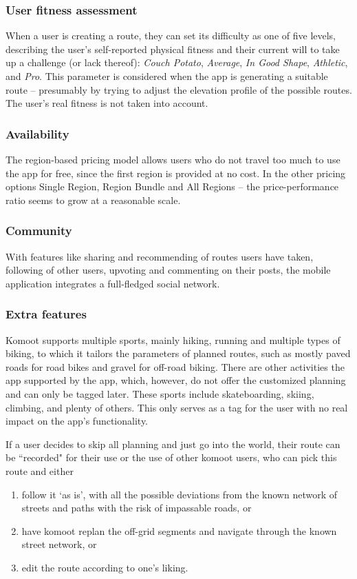 \subsubsection*{User fitness assessment}
When a user is creating a route, they can set its difficulty as one of five levels, 
describing the user's self-reported physical fitness and their current will to take up a challenge (or lack thereof): \textit{Couch Potato}, \textit{Average}, \textit{In Good Shape}, \textit{Athletic}, and \textit{Pro}.
This parameter is considered when the app is generating a suitable route -- presumably by trying to adjust the elevation profile of the possible routes.
The user's real fitness is not taken into account.

\subsubsection*{Availability}
The region-based pricing model allows users who do not travel too much to use the app for free,
since the first region is provided at no cost.
In the other pricing options Single Region, Region Bundle and All Regions -- the price-performance ratio seems to grow at a reasonable scale.
\subsubsection*{Community}
With features like sharing and recommending of routes users have taken, following of other users, upvoting and commenting on their posts, the mobile application integrates a full-fledged social network.
\subsubsection*{Extra features}
Komoot supports multiple sports, mainly hiking, running and multiple types of biking, to which it tailors the parameters of planned routes, such as mostly paved roads for road bikes and gravel for off-road biking.
There are other activities the app supported by the app, which, however, do not offer the customized planning and can only be tagged later.
These sports include skateboarding, skiing, climbing, and plenty of others.
This only serves as a tag for the user with no real impact on the app's functionality.

If a user decides to skip all planning and just go into the world, their route can be ``recorded" for their use or the use of other komoot users, who can pick this route and either

\begin{enumerate}[label=(\alph*)]
    \item follow it `as is', with all the possible deviations from the known network of streets and paths with the risk of impassable roads, or
    \item have komoot replan the off-grid segments and navigate through the known street network, or
    \item edit the route according to one's liking.
\end{enumerate}

